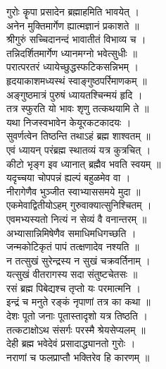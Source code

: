 गुरोः कॄपा प्रसादेन ब्रह्माहमिति भावयेत् ।\\[-2mm]
अनेन मुक्तिमार्गेण ह्यात्मज्ञानं प्रकाशते ॥\\
श्रीगुरुं सच्चिदानन्दं भावातीतं विभाव्य च ।\\[-2mm]
तन्निदर्शितमार्गेण ध्यानमग्नो भवेत्सुधीः ॥\\
परात्परतरं ध्यायेच्छुद्धस्फटिकसन्निभम् ।\\[-2mm]
हृदयाकाशमध्यस्थं स्वाङ्गुष्ठपर्रिमाणकम् ॥\\
अङ्गुष्ठमात्रं पुरुषं ध्यायतश्चिन्मयं हृदि ।\\[-2mm]
तत्र स्फुरति यो भावः शृणु तत्कथयामि ते ॥\\
यथा निजस्वभावेन केयूरकटकादयः ।\\[-2mm]
सुवर्णत्वेन तिष्ठन्ति तथाऽहं ब्रह्म शाश्वतम् ॥\\
एवं ध्यायन् परंब्रह्म स्थातव्यं यत्र कुत्रचित् ।\\[-2mm]
कीटो भृङ्ग इव ध्यानात् ब्रह्मैव भवति स्वयम् ॥\\
यदृच्चया चोपपन्नं ह्यल्पं बहुळमेव वा ।\\[-2mm]
नीरागेणैव भुञ्जीत स्वाभ्याससमये मुदा ॥\\
एकमेवाद्वितीयोऽहम् गुरुवाक्यात्सुनिश्चितम् ।\\[-2mm]
एवमभ्यस्यतो नित्यं न सेव्यं वै वनान्तरम् ॥\\
अभ्यासान्निमिषेणैव समाधिमधिगच्छति ।\\[-2mm]
जन्मकोटिकृतं पापं तत्क्षणादेव नश्यति ॥\\
न तत्सुखं सुरेन्द्रस्य न सुखं चक्रवर्तिनाम् ।\\[-2mm]
यत्सुखं वीतरागस्य सदा संतुष्टचेतसः ॥\\
रसं ब्रह्म पिबेद्यश्च तृप्तो यः परमात्मनि ।\\[-2mm]
इन्द्रं च मनुते रङ्कं नृपाणां तत्र का कथा ॥\\
देशः पूतो जनाः पूतास्तादृशो यत्र तिष्ठति ।\\[-2mm]
तत्कटाक्षोऽथ संसर्गः परस्मै श्रेयसेप्यलम्  ॥\\
देही ब्रह्म भवेदेवं प्रसादाद्ध्यानतो गुरोः ।\\[-2mm]
 नराणां च फलप्राप्तौ भक्तिरेव हि कारणम् ॥\\

